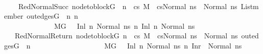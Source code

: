 \begin{isabellebody}
\ \ \isanewline
\ \ \ \ RedNormalSucc{\isacharcolon}{\kern0pt}\ {\isachardoublequoteopen}{\isasymlbrakk}node{\isacharunderscore}{\kern0pt}to{\isacharunderscore}{\kern0pt}block{\isacharparenleft}{\kern0pt}G{\isacharparenright}{\kern0pt}\ {\isacharbang}{\kern0pt}\ n\ {\isacharequal}{\kern0pt}\ cs{\isacharsemicolon}{\kern0pt}\ M{\isacharcomma}{\kern0pt}{\isasymLambda}{\isacharcomma}{\kern0pt}{\isasymGamma}{\isacharcomma}{\kern0pt}{\isasymOmega}\ {\isasymturnstile}\ {\isasymlangle}cs{\isacharcomma}{\kern0pt}Normal\ ns{\isasymrangle}\ {\isacharbrackleft}{\kern0pt}{\isasymrightarrow}{\isacharbrackright}{\kern0pt}\ Normal\ ns{\isacharprime}{\kern0pt}{\isacharsemicolon}{\kern0pt}\ List{\isachardot}{\kern0pt}member\ {\isacharparenleft}{\kern0pt}out{\isacharunderscore}{\kern0pt}edges{\isacharparenleft}{\kern0pt}G{\isacharparenright}{\kern0pt}\ {\isacharbang}{\kern0pt}\ n{\isacharparenright}{\kern0pt}\ n{\isacharprime}{\kern0pt}\ \ {\isasymrbrakk}\ {\isasymLongrightarrow}\ \isanewline
\ \ \ \ \ \ \ \ \ \ \ \ \ \ M{\isacharcomma}{\kern0pt}{\isasymLambda}{\isacharcomma}{\kern0pt}{\isasymGamma}{\isacharcomma}{\kern0pt}{\isasymOmega}{\isacharcomma}{\kern0pt}G\ \ {\isasymturnstile}\ {\isacharparenleft}{\kern0pt}Inl\ n{\isacharcomma}{\kern0pt}\ Normal\ ns{\isacharparenright}{\kern0pt}\ {\isacharminus}{\kern0pt}n{\isasymrightarrow}\ {\isacharparenleft}{\kern0pt}Inl\ n{\isacharprime}{\kern0pt}{\isacharcomma}{\kern0pt}\ Normal\ ns{\isacharprime}{\kern0pt}{\isacharparenright}{\kern0pt}{\isachardoublequoteclose}\isanewline
\ \ {\isacharbar}{\kern0pt}\ RedNormalReturn{\isacharcolon}{\kern0pt}\ {\isachardoublequoteopen}{\isasymlbrakk}node{\isacharunderscore}{\kern0pt}to{\isacharunderscore}{\kern0pt}block{\isacharparenleft}{\kern0pt}G{\isacharparenright}{\kern0pt}{\isacharbang}{\kern0pt}\ n\ {\isacharequal}{\kern0pt}\ cs{\isacharsemicolon}{\kern0pt}\ M{\isacharcomma}{\kern0pt}{\isasymLambda}{\isacharcomma}{\kern0pt}{\isasymGamma}{\isacharcomma}{\kern0pt}{\isasymOmega}\ {\isasymturnstile}\ {\isasymlangle}cs{\isacharcomma}{\kern0pt}Normal\ ns{\isasymrangle}\ {\isacharbrackleft}{\kern0pt}{\isasymrightarrow}{\isacharbrackright}{\kern0pt}\ Normal\ ns{\isacharprime}{\kern0pt}{\isacharsemicolon}{\kern0pt}\ {\isacharparenleft}{\kern0pt}out{\isacharunderscore}{\kern0pt}edges{\isacharparenleft}{\kern0pt}G{\isacharparenright}{\kern0pt}\ {\isacharbang}{\kern0pt}\ n{\isacharparenright}{\kern0pt}\ {\isacharequal}{\kern0pt}\ {\isacharbrackleft}{\kern0pt}{\isacharbrackright}{\kern0pt}\ {\isasymrbrakk}\ {\isasymLongrightarrow}\ \isanewline
\ \ \ \ \ \ \ \ \ \ \ \ \ \ \ M{\isacharcomma}{\kern0pt}{\isasymLambda}{\isacharcomma}{\kern0pt}{\isasymGamma}{\isacharcomma}{\kern0pt}{\isasymOmega}{\isacharcomma}{\kern0pt}G\ \ {\isasymturnstile}\ {\isacharparenleft}{\kern0pt}Inl\ n{\isacharcomma}{\kern0pt}\ Normal\ ns{\isacharparenright}{\kern0pt}\ {\isacharminus}{\kern0pt}n{\isasymrightarrow}\ {\isacharparenleft}{\kern0pt}Inr\ {\isacharparenleft}{\kern0pt}{\isacharparenright}{\kern0pt}{\isacharcomma}{\kern0pt}\ Normal\ ns{\isacharprime}{\kern0pt}{\isacharparenright}{\kern0pt}{\isachardoublequoteclose}\isanewline

\end{isabellebody}
